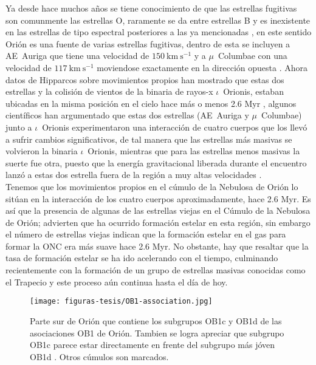 \documentclass{article}
\begin{document}
Ya desde hace muchos años se tiene conocimiento de que las estrellas fugitivas son comunmente las estrellas O, raramente se da entre estrellas B y es inexistente en las estrellas de tipo espectral posteriores a las ya mencionadas \citep{Gies:1986, Gies:1987}, en este sentido Orión es una fuente de varias estrellas fugitivas, dentro de esta se incluyen a AE~Auriga que tiene una velocidad de \(150~\text{km}~\text{s}^{-1}\)  y a \(\mu\)~Columbae con una velocidad de \(117~\text{km}~\text{s}^{-1}\) moviendose exactamente en la dirección opuesta \citep{Blaauw:1991}. Ahora datos de Hipparcos sobre movimientos propios han mostrado que estas dos estrellas y la colisión de vientos de la binaria de rayos-x \(\iota\)~Orionis, estaban ubicadas en la misma posición en el cielo hace más o menos 2.6 Myr \citep{Hoogerwerf:2001}, algunos científicos han argumentado que estas dos estrellas (AE~Auriga y  \(\mu\)~Columbae) junto a \(\iota\)~Orionis experimentaron una interacción de cuatro cuerpos que los llevó a sufrir cambios significativos, de tal manera que las estrellas más masivas se volvieron la binaria \(\iota\)~Orionis, mientras que para las estrellas menos masivas la suerte fue otra, puesto que la energía gravitacional liberada durante el encuentro lanzó a estas dos estrella fuera de la región a muy altas velocidades \citep{Gualandris:2004}.\\   

Tenemos que los movimientos propios en el cúmulo de la Nebulosa de Orión lo sitúan en la interacción de los cuatro cuerpos aproximadamente, hace 2.6 Myr. Es así que la presencia de algunas de las estrellas viejas en el Cúmulo de la Nebulosa de Orión; advierten que ha ocurrido formación estelar en esta región, sin embargo el número de estrellas viejas indican que la formación estelar en el gas para formar la ONC era más suave hace 2.6 Myr. No obstante, hay que resaltar que la tasa de formación estelar se ha ido acelerando con el tiempo, culminando recientemente con la formación de un grupo de estrellas masivas conocidas como el Trapecio y este proceso aún continua hasta el día de hoy.\\

\begin{figure}
  \centering
  \texttt{[image: figuras-tesis/OB1-association.jpg]}
  \caption{Parte sur de  Orión que contiene los subgrupos OB1c y OB1d de las asociaciones OB1 de Orión. Tambien se logra apreciar que subgrupo OB1c parece estar directamente en frente del subgrupo más jóven OB1d \citep{Bally:2008a}. Otros cúmulos son marcados.}
  \label{fig:OB1-association}
\end{figure}
  
\end{document}

